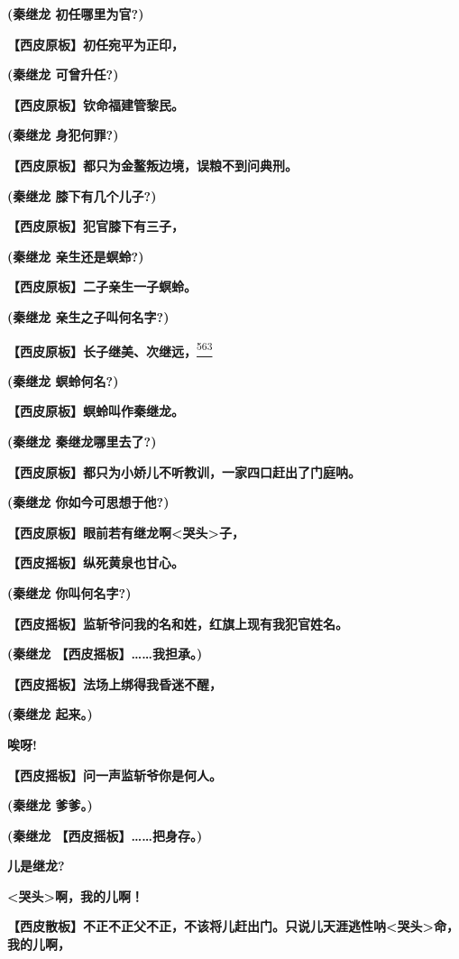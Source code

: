 \textbf{(秦继龙 初任哪里为官?)}

\textbf{【西皮原板】初任宛平为正印，}

\textbf{(秦继龙 可曾升任?)}

\textbf{【西皮原板】钦命福建管黎民。}

\textbf{(秦继龙 身犯何罪?)}

\textbf{【西皮原板】都只为金鳌叛边境，误粮不到问典刑。}

\textbf{(秦继龙 膝下有几个儿子?)}

\textbf{【西皮原板】犯官膝下有三子，}

\textbf{(秦继龙 亲生还是螟蛉?)}

\textbf{【西皮原板】二子亲生一子螟蛉。}

\textbf{(秦继龙 亲生之子叫何名字?)}

\textbf{【西皮原板】长子继美、次继远，}\protect\hyperlink{fn563}{\textsuperscript{563}}

\textbf{(秦继龙 螟蛉何名?)}

\textbf{【西皮原板】螟蛉叫作秦继龙。}

\textbf{(秦继龙 秦继龙哪里去了?)}

\textbf{【西皮原板】都只为小娇儿不听教训，一家四口赶出了门庭呐。}

\textbf{(秦继龙 你如今可思想于他?)}

\textbf{【西皮原板】眼前若有继龙啊\textless{}哭头\textgreater{}子，}

\textbf{【西皮摇板】纵死黄泉也甘心。}

\textbf{(秦继龙 你叫何名字?)}

\textbf{【西皮摇板】监斩爷问我的名和姓，红旗上现有我犯官姓名。}

\textbf{(秦继龙 【西皮摇板】\ldots{}\ldots{}我担承。)}

\textbf{【西皮摇板】法场上绑得我昏迷不醒，}

\textbf{(秦继龙 起来。)}

\textbf{唉呀!}

\textbf{【西皮摇板】问一声监斩爷你是何人。}

\textbf{(秦继龙 爹爹。)}

\textbf{(秦继龙 【西皮摇板】\ldots{}\ldots{}把身存。)}

\textbf{儿是继龙?}

\textbf{\textless{}哭头\textgreater{}啊，我的儿啊！}

\textbf{【西皮散板】不正不正父不正，不该将儿赶出门。只说儿天涯逃性呐\textless{}哭头\textgreater{}命，我的儿啊，}

